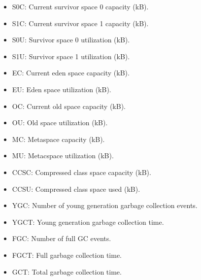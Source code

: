 \begin{itemize}
    \item S0C: Current survivor space 0 capacity (kB).

    \item S1C: Current survivor space 1 capacity (kB).
    
    \item S0U: Survivor space 0 utilization (kB).
    
    \item S1U: Survivor space 1 utilization (kB).
    
    \item EC: Current eden space capacity (kB).
    
    \item EU: Eden space utilization (kB).
    
    \item OC: Current old space capacity (kB).
    
    \item OU: Old space utilization (kB).
    
    \item MC: Metaspace capacity (kB).
    
    \item MU: Metacspace utilization (kB).
    
    \item CCSC: Compressed class space capacity (kB).
    
    \item CCSU: Compressed class space used (kB).
    
    \item YGC: Number of young generation garbage collection events.
    
    \item YGCT: Young generation garbage collection time.
    
    \item FGC: Number of full GC events.
    
    \item FGCT: Full garbage collection time.
    
    \item GCT: Total garbage collection time.
\end{itemize}